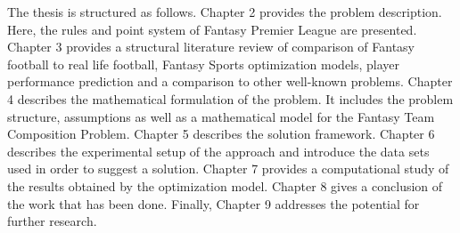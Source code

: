 The thesis is structured as follows. Chapter 2 provides the problem description. Here, the rules and point system of Fantasy Premier League are presented. Chapter 3 provides a structural literature review of comparison of Fantasy football to real life football, Fantasy Sports optimization models, player performance prediction and a comparison to other well-known problems. Chapter 4 describes the mathematical formulation of the problem. It includes the problem structure, assumptions as well as a mathematical model for the Fantasy Team Composition Problem. Chapter 5 describes the solution framework. Chapter 6 describes the experimental setup of the approach and introduce the data sets used in order to suggest a solution. Chapter 7 provides a computational study of the results obtained by the optimization model. Chapter 8 gives a conclusion of the work that has been done. Finally, Chapter 9 addresses the potential for further research.



